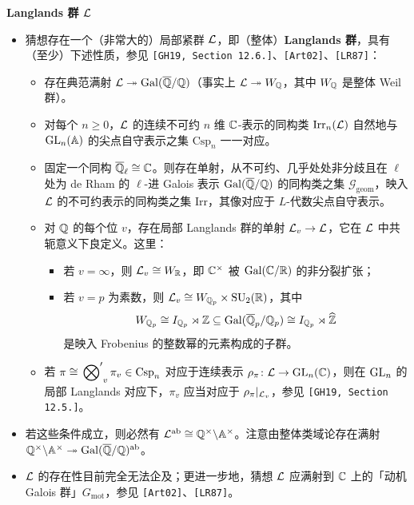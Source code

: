 \medskip
\noindent\textbf{Langlands 群 $\mathcal{L}$}
\begin{itemize}
\item 猜想存在一个（非常大的）局部紧群 $\mathcal{L}$，即（整体）\textbf{Langlands 群}，具有（至少）下述性质，参见 \texttt{[GH19, Section 12.6.]}、\texttt{[Art02]}、\texttt{[LR87]}：
\begin{itemize}
\item 存在典范满射 $\mathcal{L}\twoheadrightarrow\operatorname{Gal}(\overline{\mathbb{Q}}/\mathbb{Q})$（事实上 $\mathcal{L}\twoheadrightarrow W_{\mathbb{Q}}$，其中 $W_{\mathbb{Q}}$ 是整体 Weil 群）。
\item 对每个 $n\ge0$，$\mathcal{L}$ 的连续不可约 $n$ 维 $\mathbb{C}$-表示的同构类 $\mathrm{Irr}_n(\mathcal{L})$ 自然地与 $\operatorname{GL}_n(\mathbb{A})$ 的尖点自守表示之集 $\mathrm{Csp}_n$ 一一对应。
\item 固定一个同构 $\overline{\mathbb{Q}}_\ell\cong\mathbb{C}$。则存在单射，从不可约、几乎处处非分歧且在 $\ell$ 处为 de Rham 的 $\ell$-进 Galois 表示 $\operatorname{Gal}(\overline{\mathbb{Q}}/\mathbb{Q})$ 的同构类之集 $\mathcal{G}_{\mathrm{geom}}$，映入 $\mathcal{L}$ 的不可约表示的同构类之集 $\mathrm{Irr}$，其像对应于 $L$-代数尖点自守表示。
\item 对 $\mathbb{Q}$ 的每个位 $v$，存在局部 Langlands 群的单射 $\mathcal{L}_v\to\mathcal{L}$，它在 $\mathcal{L}$ 中共轭意义下良定义。这里：
\begin{itemize}
\item 若 $v=\infty$，则 $\mathcal{L}_v\cong W_{\mathbb{R}}$，即 $\mathbb{C}^\times$ 被 $\operatorname{Gal}(\mathbb{C}/\mathbb{R})$ 的非分裂扩张；
\item 若 $v=p$ 为素数，则 $\mathcal{L}_v\cong W_{\mathbb{Q}_p}\times\mathrm{SU}_2(\mathbb{R})$，其中
\[
W_{\mathbb{Q}_p}\cong I_{\mathbb{Q}_p}\rtimes\mathbb{Z}\subseteq\operatorname{Gal}(\overline{\mathbb{Q}}_p/\mathbb{Q}_p)\cong I_{\mathbb{Q}_p}\rtimes\widehat{\mathbb{Z}}
\]
是映入 Frobenius 的整数幂的元素构成的子群。
\end{itemize}
\item 若 $\pi\cong\sideset{}{'}\bigotimes_v\pi_v\in\mathrm{Csp}_n$ 对应于连续表示 $\rho_\pi\colon\mathcal{L}\to\operatorname{GL}_n(\mathbb{C})$，则在 $\operatorname{GL}_n$ 的局部 Langlands 对应下，$\pi_v$ 应当对应于 $\rho_\pi|_{\mathcal{L}_v}$，参见 \texttt{[GH19, Section 12.5.]}。
\end{itemize}
\item 若这些条件成立，则必然有 $\mathcal{L}^{\mathrm{ab}}\cong\mathbb{Q}^\times\backslash\mathbb{A}^\times$。注意由整体类域论存在满射 $\mathbb{Q}^\times\backslash\mathbb{A}^\times\twoheadrightarrow\operatorname{Gal}(\overline{\mathbb{Q}}/\mathbb{Q})^{\mathrm{ab}}$。
\item $\mathcal{L}$ 的存在性目前完全无法企及；更进一步地，猜想 $\mathcal{L}$ 应满射到 $\mathbb{C}$ 上的「动机 Galois 群」$G_{\mathrm{mot}}$，参见 \texttt{[Art02]}、\texttt{[LR87]}。
\end{itemize}

